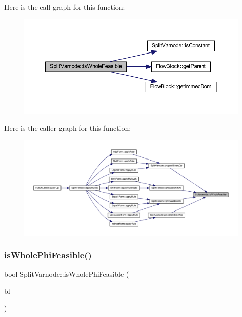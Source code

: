 Here is the call graph for this function\+:
\nopagebreak
\begin{figure}[H]
\begin{center}
\leavevmode
\includegraphics[width=350pt]{class_split_varnode_a6a47b2837232b23935419b5e62643991_cgraph}
\end{center}
\end{figure}
Here is the caller graph for this function\+:
\nopagebreak
\begin{figure}[H]
\begin{center}
\leavevmode
\includegraphics[width=350pt]{class_split_varnode_a6a47b2837232b23935419b5e62643991_icgraph}
\end{center}
\end{figure}
\mbox{\label{class_split_varnode_a0f6bba38e4adb554ebb69658cf3e3ee7}} 
\subsubsection{\texorpdfstring{isWholePhiFeasible()}{isWholePhiFeasible()}}
{\footnotesize\ttfamily bool Split\+Varnode\+::is\+Whole\+Phi\+Feasible (\begin{DoxyParamCaption}\item[{\mbox{\hyperlink{class_flow_block}{Flow\+Block}} $\ast$}]{bl }\end{DoxyParamCaption})}



